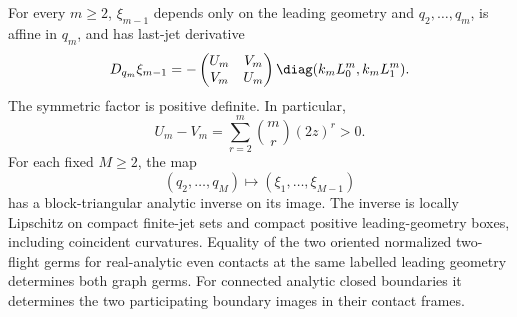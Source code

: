 \begin{theorem}
\label{thm:v13-two-flight}
For every $m\ge2$, $\xi_{m-1}$ depends only on the leading geometry
and $q_2,\ldots,q_m$, is affine in $q_m$, and has last-jet derivative
\begin{equation}\label{eq:v13-two-flight-block}
 D_{q_m}\xi_{m-1}
 =-\begin{pmatrix}U_m&V_m\\ V_m&U_m\end{pmatrix}
                         \diag(k_mL_0^m,k_mL_1^m).
\end{equation}
The symmetric factor is positive definite. In particular,
\begin{equation}\label{eq:v13-separation}
 U_m-V_m=\sum_{r=2}^{m}\binom mr(2z)^r>0.
\end{equation}
For each fixed $M\ge2$, the map
\[
 (q_2,\ldots,q_M)\longmapsto(\xi_1,\ldots,\xi_{M-1})
\]
has a block-triangular analytic inverse on its image. The inverse is
locally Lipschitz on compact finite-jet sets and compact positive
leading-geometry boxes, including coincident curvatures. Equality of
the two oriented normalized two-flight germs for real-analytic even
contacts at the same labelled leading geometry determines both graph
germs. For connected analytic closed boundaries it determines the two
participating boundary images in their contact frames.
\end{theorem}

